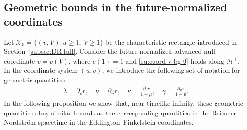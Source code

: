\documentclass[10pt, reqno]{amsart}
\theoremstyle{definition}
\theoremstyle{remark}
\theoremstyle{conjecture}
\numberwithin{equation}{section}
\newcommand{\set}[1]{\{#1\}}
\newcommand{\rd}{\partial}
\newcommand{\0}{\emptyset}
\newcommand{\gmm}{\gamma}
\newcommand{\kpp}{\kappa}
\newcommand{\lmb}{\lambda}
\newcommand{\calH}{\mathcal H}
\newcommand{\calX}{\mathcal X}
\newcommand{\dur}{\nu}
\newcommand{\dvr}{\lmb}
\newcommand{\EH}{\calH^{+}}
\begin{document}
\subsection{Geometric bounds in the future-normalized coordinates} \label{subsec:bg-uv}
Let $\calX_{0} = \set{(u, V) : u \geq 1, \ V \geq 1}$ be the characteristic rectangle introduced in Section~\ref{subsec:DR-full}. Consider the future-normalized advanced null coordinate $v = v(V)$, where $v(1) = 1$ and \eqref{eq:coord-v-bg-0} holds along $\EH$.
In the coordinate system $(u, v)$, we introduce the following set of notation for geometric quantities:
\begin{align*}
	\dvr = \rd_{v} r, \quad \dur = \rd_{u} r, \quad
	\kpp = \frac{\rd_{v} r}{1-\mu}, \quad \gmm = \frac{\rd_{u} r}{1-\mu}.
\end{align*}
In the following proposition we show that, near timelike infinity, these geometric quantities obey similar bounds as the corresponding quantities in the Reissner--Nordstr\"om spacetime in the Eddington--Finkelstein coordinates. 
\end{document}
